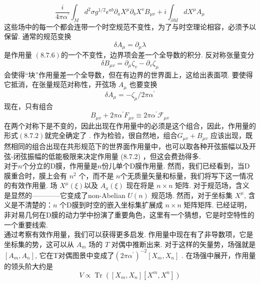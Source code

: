 \begin{equation}
	\frac{i}{4 \pi \alpha^{\prime}} \int_{M} d^{2} \sigma g^{1 / 2} \epsilon^{a b} \partial_{a} X^{\mu} \partial_{b} X^{v} B_{\mu v}+i \int_{\partial M} d X^{\mu} A_{\mu}
\end{equation}
这些场中的每一个都会连带一个时空规范不变性，为了与时空理论相容，必须予以保留. 通常的规范变换
\begin{equation}
	\delta A_{\mu}=\partial_{\mu} \lambda
\end{equation}
是作用量 $(8.7 .6)$的一个不变性，边界项会差一个全导数的积分. 反对称张量变分
\begin{equation}
	\delta B_{\mu v}=\partial_{\mu} \zeta_{v}-\partial_{v} \zeta_{\mu}
\end{equation}
会使得“块”作用量差一个全导数，但在有边界的世界面上，这给出表面项. 要使得它抵消，在张量规范对称性，开弦场 $A_{\mu}$ 也要变换
\begin{equation}
	\delta A_{\mu}=-\zeta_{\mu} / 2 \pi \alpha^{\prime}
\end{equation}
现在，只有组合
\begin{equation}
	B_{\mu v}+2 \pi \alpha^{\prime} F_{\mu v} \equiv 2 \pi \alpha^{\prime} \mathscr{F}_{\mu v}
\end{equation}
在两个对称下是不变的，因此出现在作用量中的必须是这个组合，因此，作用量的形式$(8.7 .2)$就完全确定了 .
作为检验，很自然地，组合$G_{\mu v}+B_{\mu v}$ 应该出现，既然相同的组合出现在共形规范下的世界面作用量中，也可以取各种开弦振幅以及开弦-闭弦振幅的低能极限来决定作用量 (8.7.2) ，但这会费劲得多.\\
对于$n$个分立的D膜，作用量是$n$份儿单个D膜作用量. 然而，我们已经看到，当D膜重合时，膜上会有 $n^{2}$ 个，而不是 $n$个无质量矢量和标量，我们将写下这一情况的有效作用量. 场 $X^{\mu}(\xi)$以及 $A_{a}(\xi)$ 现在将是 $n \times n$ 矩阵. 对于规范场，含义是显然的————它变成了non-Abelian $U(n)$ 规范场. 然而，对于坐标集 $X^{\mu}$, 含义是不清楚的：$n$ 个D膜到时空的嵌入坐标集扩展成 $n \times n$ 矩阵矩阵. 已经证明，非对易几何在D膜的动力学中扮演了重要角色，这里有一个猜想，它是时空特性的一个重要线索.\\
通过考察有效作用量，我们可以获得更多启发. 作用量中现在有了非导数项，它是坐标集的势，这可以从 $A_{m}$ 场的 $T$ 对偶中推断出来. 对于这样的矢量势，场强就是$\left[A_{m}, A_{n}\right]$, 它在T对偶图景中变成了$\left(2 \pi \alpha^{\prime}\right)^{-2}\left[X_{m}, X_{n}\right]$ . 在场强中展开，作用量的领头阶大约是
\begin{equation}
	V \propto \operatorname{Tr}\left(\left[X_{m}, X_{n}\right]\left[X^{m}, X^{n}\right]\right)
\end{equation}
